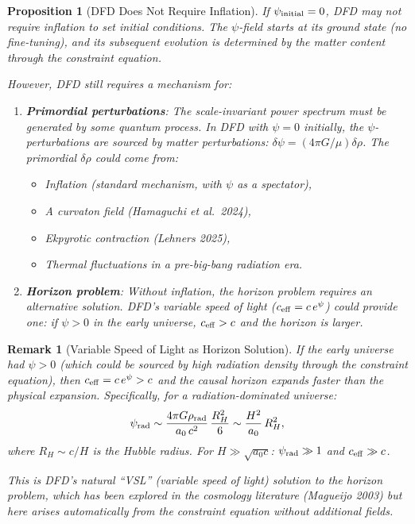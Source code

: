 \documentclass[11pt,a4paper]{article}
\newtheorem{proposition}{Proposition}
\newtheorem{remark}{Remark}
\begin{document}
\begin{proposition}[DFD Does Not Require Inflation]
\label{prop:no-inflation}
If $\psi_{\rm initial} = 0$, DFD may not require inflation to set initial conditions. The $\psi$-field starts at its ground state (no fine-tuning), and its subsequent evolution is determined by the matter content through the constraint equation.

However, DFD still requires a mechanism for:
\begin{enumerate}
\item \textbf{Primordial perturbations}: The scale-invariant power spectrum must be generated by some quantum process. In DFD with $\psi = 0$ initially, the $\psi$-perturbations are \emph{sourced} by matter perturbations: $\delta\psi = (4\pi G/\mu)\delta\rho$. The primordial $\delta\rho$ could come from:
\begin{itemize}
\item Inflation (standard mechanism, with $\psi$ as a spectator),
\item A curvaton field (Hamaguchi et al.\ 2024),
\item Ekpyrotic contraction (Lehners 2025),
\item Thermal fluctuations in a pre-big-bang radiation era.
\end{itemize}
\item \textbf{Horizon problem}: Without inflation, the horizon problem requires an alternative solution. DFD's variable speed of light ($c_{\rm eff} = c\,e^\psi$) could provide one: if $\psi > 0$ in the early universe, $c_{\rm eff} > c$ and the horizon is larger.
\end{enumerate}
\end{proposition}

\begin{remark}[Variable Speed of Light as Horizon Solution]
If the early universe had $\psi > 0$ (which could be sourced by high radiation density through the constraint equation), then $c_{\rm eff} = c\,e^\psi > c$ and the causal horizon expands faster than the physical expansion. Specifically, for a radiation-dominated universe:
\begin{equation}
\psi_{\rm rad} \sim \frac{4\pi G\rho_{\rm rad}}{a_0\,c^2}\,\frac{R_H^2}{6} \sim \frac{H^2}{a_0}\,R_H^2,
\end{equation}
where $R_H \sim c/H$ is the Hubble radius. For $H \gg \sqrt{a_0 c}$: $\psi_{\rm rad} \gg 1$ and $c_{\rm eff} \gg c$.

This is DFD's natural ``VSL'' (variable speed of light) solution to the horizon problem, which has been explored in the cosmology literature (Magueijo 2003) but here arises automatically from the constraint equation without additional fields.
\end{remark}
\end{document}
